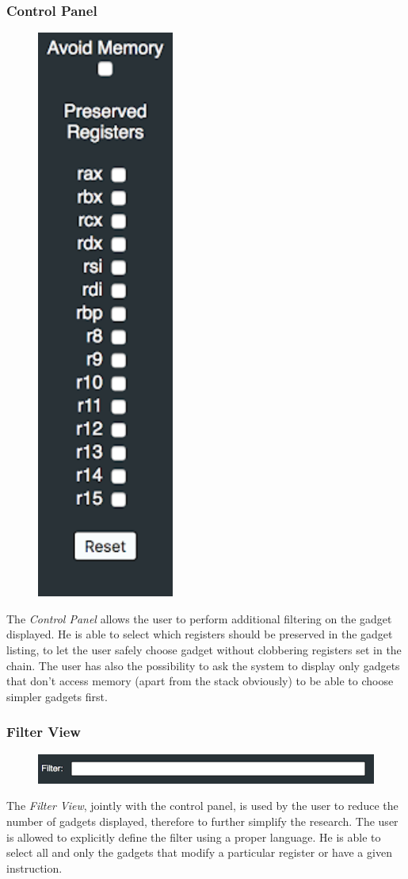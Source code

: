 \documentclass[twocolumn, 11pt]{article}
\begin{document}
\subsubsection{Control Panel}
\begin{figure}[htb]
  \centering
  \includegraphics[width=0.15\linewidth]{control-panel}
\end{figure}

The \textit{Control Panel} allows the user to perform additional filtering on the gadget displayed. He is able to select which registers should be preserved in the gadget listing, to let the user safely choose gadget without clobbering registers set in the chain. The user has also the possibility to ask the system to display only gadgets that don't access memory (apart from the stack obviously) to be able to choose simpler gadgets first.

\subsubsection{Filter View}
\begin{figure}[htb]
  \centering
  \includegraphics[width=0.8\linewidth]{filter-view}
\end{figure}

The \textit{Filter View}, jointly with the control panel, is used by the user to reduce the number of gadgets displayed, therefore to further simplify the research. The user is allowed to explicitly define the filter using a proper language. He is able to select all and only the gadgets that modify a particular register or have a given instruction.
\end{document}

